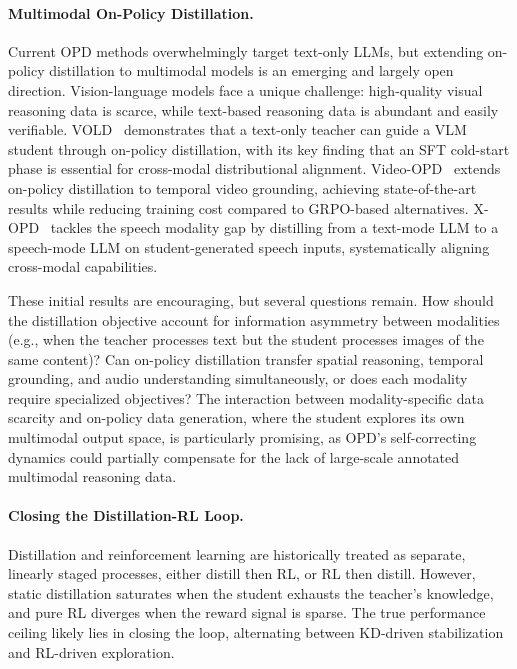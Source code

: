 \documentclass{article} %
\begin{document}
\paragraph{Multimodal On-Policy Distillation.}
Current OPD methods overwhelmingly target text-only LLMs, but extending on-policy distillation to multimodal models is an emerging and largely open direction. Vision-language models face a unique challenge: high-quality visual reasoning data is scarce, while text-based reasoning data is abundant and easily verifiable. VOLD~\citep{2510.23497} demonstrates that a text-only teacher can guide a VLM student through on-policy distillation, with its key finding that an SFT cold-start phase is essential for cross-modal distributional alignment. Video-OPD~\citep{2602.02994} extends on-policy distillation to temporal video grounding, achieving state-of-the-art results while reducing training cost compared to GRPO-based alternatives. X-OPD~\citep{2603.24596} tackles the speech modality gap by distilling from a text-mode LLM to a speech-mode LLM on student-generated speech inputs, systematically aligning cross-modal capabilities.

These initial results are encouraging, but several questions remain. How should the distillation objective account for information asymmetry between modalities (e.g., when the teacher processes text but the student processes images of the same content)? Can on-policy distillation transfer spatial reasoning, temporal grounding, and audio understanding simultaneously, or does each modality require specialized objectives? The interaction between modality-specific data scarcity and on-policy data generation, where the student explores its own multimodal output space, is particularly promising, as OPD's self-correcting dynamics could partially compensate for the lack of large-scale annotated multimodal reasoning data.

\paragraph{Closing the Distillation-RL Loop.}
Distillation and reinforcement learning are historically treated as separate, linearly staged processes, either distill then RL, or RL then distill. However, static distillation saturates when the student exhausts the teacher's knowledge, and pure RL diverges when the reward signal is sparse. The true performance ceiling likely lies in closing the loop, alternating between KD-driven stabilization and RL-driven exploration.
\end{document}
